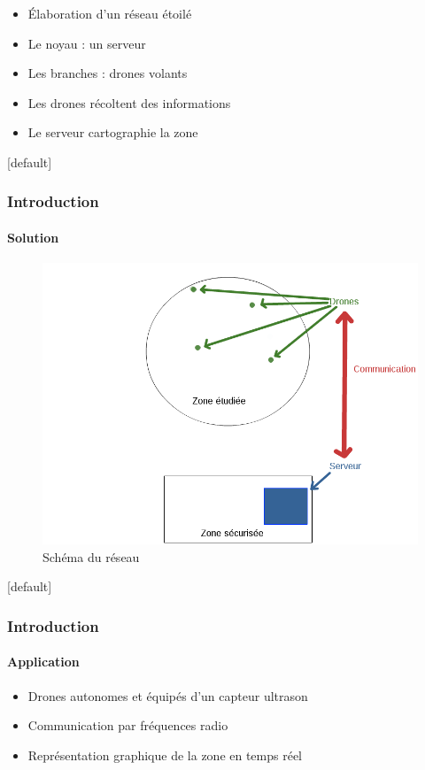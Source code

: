 \documentclass{beamer}
\begin{document}
{\begin{frame}
      \begin{itemize}
	\item Élaboration d'un réseau étoilé
	\item Le noyau : un serveur
	\item Les branches : drones volants
	\item Les drones récoltent des informations
	\item Le serveur cartographie la zone
      \end{itemize}
    \end{frame}
    
    \makeatletter
    [default]
    \def\beamer@entrycode{\vspace*{-\headheight}}
    \makeatother
    \begin{frame}
      \frametitle{Introduction}
      \framesubtitle{Solution}
      
      \begin{figure}[htbp]
	\centering
	\includegraphics[scale=0.23]{img/projet_schema.png}
	\caption{Schéma du réseau}
      \end{figure}  
    \end{frame}
    
    \makeatletter
    [default]
    \def\beamer@entrycode{\vspace*{-\headheight}}
    \makeatother
    \begin{frame}
      \frametitle{Introduction}
      \framesubtitle{Application}
      
      \begin{itemize}
	\item Drones autonomes et équipés d'un capteur ultrason
	\item Communication par fréquences radio
	\item Représentation graphique de la zone en temps réel
      \end{itemize}
    \end{frame}
  }
  
\end{document}

